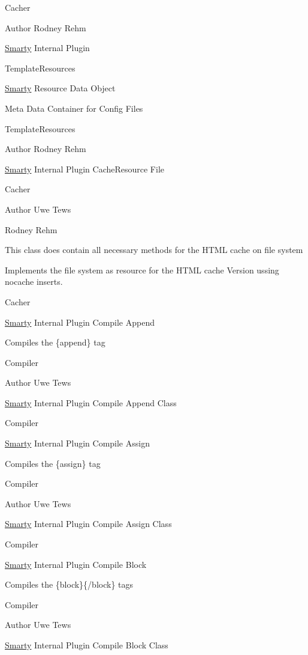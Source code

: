 Cacher \begin{DoxyAuthor}{Author}
Rodney Rehm
\end{DoxyAuthor}
\hyperlink{class_smarty}{Smarty} Internal Plugin

Template\+Resources

\hyperlink{class_smarty}{Smarty} Resource Data Object

Meta Data Container for Config Files

Template\+Resources \begin{DoxyAuthor}{Author}
Rodney Rehm
\end{DoxyAuthor}
\hyperlink{class_smarty}{Smarty} Internal Plugin Cache\+Resource File

Cacher \begin{DoxyAuthor}{Author}
Uwe Tews 

Rodney Rehm
\end{DoxyAuthor}
This class does contain all necessary methods for the H\+T\+M\+L cache on file system

Implements the file system as resource for the H\+T\+M\+L cache Version ussing nocache inserts.

Cacher

\hyperlink{class_smarty}{Smarty} Internal Plugin Compile Append

Compiles the \{append\} tag

Compiler \begin{DoxyAuthor}{Author}
Uwe Tews
\end{DoxyAuthor}
\hyperlink{class_smarty}{Smarty} Internal Plugin Compile Append Class

Compiler

\hyperlink{class_smarty}{Smarty} Internal Plugin Compile Assign

Compiles the \{assign\} tag

Compiler \begin{DoxyAuthor}{Author}
Uwe Tews
\end{DoxyAuthor}
\hyperlink{class_smarty}{Smarty} Internal Plugin Compile Assign Class

Compiler

\hyperlink{class_smarty}{Smarty} Internal Plugin Compile Block

Compiles the \{block\}\{/block\} tags

Compiler \begin{DoxyAuthor}{Author}
Uwe Tews
\end{DoxyAuthor}
\hyperlink{class_smarty}{Smarty} Internal Plugin Compile Block Class

